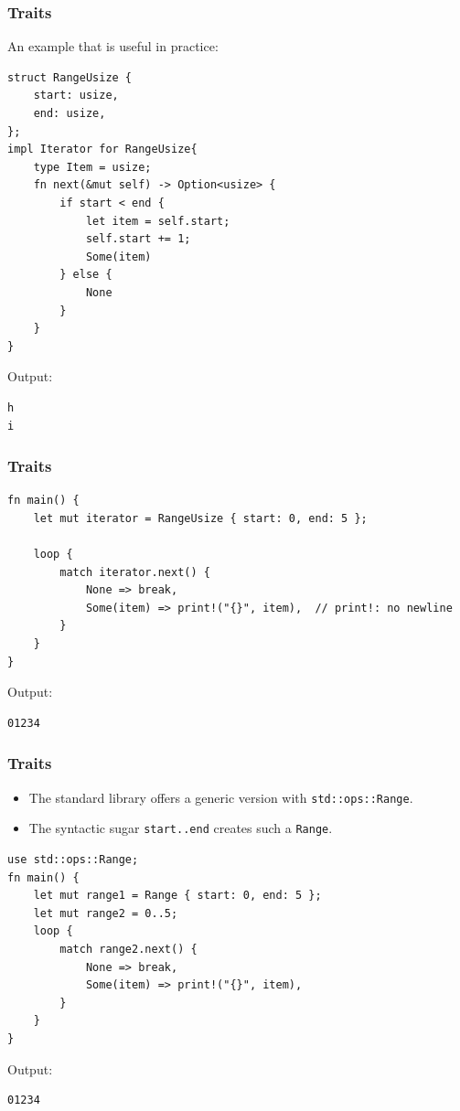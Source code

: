 \begin{frame}[fragile]
    \frametitle{Traits}
    An example that is useful in practice:
    \begin{verbatim}
struct RangeUsize {
    start: usize,
    end: usize,
};
impl Iterator for RangeUsize{
    type Item = usize;
    fn next(&mut self) -> Option<usize> {
        if start < end {
            let item = self.start;
            self.start += 1;
            Some(item)
        } else {
            None
        }
    }
}
    \end{verbatim}
    \vfill
    Output:
    \pause
    \begin{verbatim}
h
i
    \end{verbatim}
\end{frame}

\begin{frame}[fragile]
    \frametitle{Traits}
    \begin{verbatim}
fn main() {
    let mut iterator = RangeUsize { start: 0, end: 5 };

    loop {
        match iterator.next() {
            None => break,
            Some(item) => print!("{}", item),  // print!: no newline
        }
    }
}
    \end{verbatim}
    \vfill
    Output:
    \pause
    \begin{verbatim}
01234
    \end{verbatim}
\end{frame}

\begin{frame}[fragile]
    \frametitle{Traits}
    \begin{itemize}
        \item The standard library offers a generic version with \texttt{std::ops::Range}.
        \item The syntactic sugar \texttt{start..end} creates such a \texttt{Range}.
    \end{itemize}
    \pause
    \vfill
    \begin{verbatim}
use std::ops::Range;
fn main() {
    let mut range1 = Range { start: 0, end: 5 };
    let mut range2 = 0..5;
    loop {
        match range2.next() {
            None => break,
            Some(item) => print!("{}", item),
        }
    }
}
    \end{verbatim}
    \pause
    \vfill
    Output:
    \begin{verbatim}
01234
    \end{verbatim}
\end{frame}

